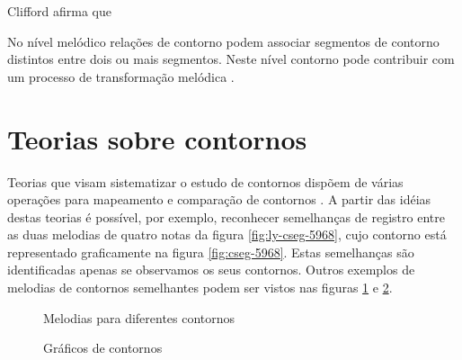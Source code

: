 Clifford afirma que 

No nível melódico relações de contorno podem associar segmentos de
contorno distintos entre dois ou mais segmentos. Neste nível contorno
pode contribuir com um processo de transformação melódica
\cite[p. 159]{clifford95:contour}.

\section{Teorias sobre contornos}
\label{sec:teor-sobre-cont}

Teorias que visam sistematizar o estudo de contornos dispõem de várias
operações para mapeamento e comparação de contornos
\cite{friedmann85:methodology,friedmann87:response,morris87:composition,morris93:directions,marvin.ea87:relating,clifford95:contour,polansky.ea92:possible,quinn97:fuzzy,beard03:contour}
.  A partir das idéias destas teorias é
possível, por exemplo, reconhecer semelhanças de registro entre as
duas melodias de quatro notas da figura \ref{fig:ly-cseg-5968}, cujo
contorno está representado graficamente na figura
\ref{fig:cseg-5968}. Estas semelhanças são identificadas apenas se
observamos os seus contornos. Outros exemplos de melodias de contornos
semelhantes podem ser vistos nas figuras \ref{fig:melodias-cseg} e
\ref{fig:graficos-cseg}.

\begin{figure}
  \centering

  \caption{Melodias para diferentes contornos}
  \label{fig:melodias-cseg}
\end{figure}

\begin{figure}
  \centering
  \subfloat[contorno P(5 9 6 8)]{
    \texttt{[image: c-5968]}
    \label{fig:cseg-5968}
  }
  \subfloat[contorno Q(5 7 6 8)]{
    \texttt{[image: c-5768]}
    \label{fig:cseg-5768}
  }
  \subfloat[contorno R(3 0 5 1)]{
    \texttt{[image: c-3051]}

    \label{fig:cseg-3051}
  }
  \caption{Gráficos de contornos}
  \label{fig:graficos-cseg}
\end{figure}

